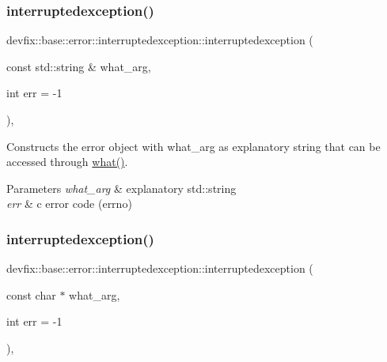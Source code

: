 \subsubsection{\texorpdfstring{interruptedexception()}{interruptedexception()}\hspace{0.1cm}{\footnotesize\ttfamily [1/2]}}
{\footnotesize\ttfamily devfix\+::base\+::error\+::interruptedexception\+::interruptedexception (\begin{DoxyParamCaption}\item[{const std\+::string \&}]{what\+\_\+arg,  }\item[{int}]{err = {\ttfamily -\/1} }\end{DoxyParamCaption})\hspace{0.3cm}{\ttfamily [inline]}, {\ttfamily [explicit]}}

Constructs the error object with what\+\_\+arg as explanatory string that can be accessed through \hyperlink{structdevfix_1_1base_1_1error_1_1baseexception_a16327152a55d65b1e537825231fbd452}{what()}. 
\begin{DoxyParams}{Parameters}
{\em what\+\_\+arg} & explanatory std\+::string \\
\hline
{\em err} & c error code (errno) \\
\hline
\end{DoxyParams}
\mbox{\label{structdevfix_1_1base_1_1error_1_1interruptedexception_a244a67233ab2b7be511706d8398ed860}} 
\subsubsection{\texorpdfstring{interruptedexception()}{interruptedexception()}\hspace{0.1cm}{\footnotesize\ttfamily [2/2]}}
{\footnotesize\ttfamily devfix\+::base\+::error\+::interruptedexception\+::interruptedexception (\begin{DoxyParamCaption}\item[{const char $\ast$}]{what\+\_\+arg,  }\item[{int}]{err = {\ttfamily -\/1} }\end{DoxyParamCaption})\hspace{0.3cm}{\ttfamily [inline]}, {\ttfamily [explicit]}}

